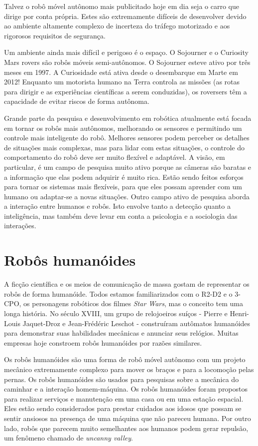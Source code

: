 Talvez o robô móvel autônomo mais publicitado hoje em dia seja o carro que dirige por conta própria. Estes são extremamente difíceis de desenvolver devido ao ambiente altamente complexo de incerteza do tráfego motorizado e aos rigorosos requisitos de segurança.

Um ambiente ainda mais difícil e perigoso é o espaço. O Sojourner e o Curiosity Mars rovers são robôs móveis semi-autônomos. O Sojourner esteve ativo por três meses em 1997. A Curiosidade está ativa desde o desembarque em Marte em 2012! Enquanto um motorista humano na Terra controla as missões (as rotas para dirigir e as experiências científicas a serem conduzidas), os roversers têm a capacidade de evitar riscos de forma autônoma.

Grande parte da pesquisa e desenvolvimento em robótica atualmente está focada em tornar os robôs mais autônomos, melhorando os sensores e permitindo um controle mais inteligente do robô. Melhores sensores podem perceber os detalhes de situações mais complexas, mas para lidar com estas situações, o controle do comportamento do robô deve ser muito flexível e adaptável. A visão, em particular, é um campo de pesquisa muito ativo porque as câmeras são baratas e a informação que elas podem adquirir é muito rica. Estão sendo feitos esforços para tornar os sistemas mais flexíveis, para que eles possam aprender com um humano ou adaptar-se a novas situações. Outro campo ativo de pesquisa aborda a interação entre humanos e robôs. Isto envolve tanto a detecção quanto a inteligência, mas também deve levar em conta a psicologia e a sociologia das interações.

\section{Robôs humanóides}

A ficção científica e os meios de comunicação de massa gostam de representar os robôs de forma humanóide. Todos estamos familiarizados com o R2-D2 e o 3-CPO, os personagens robóticos dos filmes \emph{Star Wars}, mas o conceito tem uma longa história. No século XVIII, um grupo de relojoeiros suíços - Pierre e Henri-Louis Jaquet-Droz e Jean-Fr\'{e}d\'{e}ric Leschot - construíram autômatos humanóides para demonstrar suas habilidades mecânicas e anunciar seus relógios. Muitas empresas hoje constroem robôs humanóides por razões similares.

Os robôs humanóides são uma forma de robô móvel autônomo com um projeto mecânico extremamente complexo para mover os braços e para a locomoção pelas pernas. Os robôs humanóides são usados para pesquisas sobre a mecânica do caminhar e a interação homem-máquina. Os robôs humanóides foram propostos para realizar serviços e manutenção em uma casa ou em uma estação espacial. Eles estão sendo considerados para prestar cuidados aos idosos que possam se sentir ansiosos na presença de uma máquina que não pareceu humana. Por outro lado, robôs que parecem muito semelhantes aos humanos podem gerar repulsão, um fenômeno chamado de \emph{uncanny valley}.

